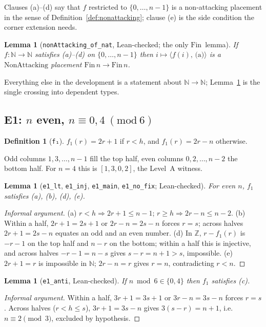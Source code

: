 \documentclass[11pt,a4paper]{article}
\newtheorem{lemma}[theorem]{Lemma}
\theoremstyle{definition}
\newtheorem{definition}[theorem]{Definition}
\theoremstyle{remark}
\newcommand{\lean}[1]{\texttt{#1}}
\newcommand{\N}{\mathbb{N}}
\newcommand{\Fin}{\mathrm{Fin}\,}
\newcommand{\NonAttacking}{\mathrm{NonAttacking}}
\begin{document}
Clauses (a)--(d) say that $f$ restricted to $\{0,\dots,n-1\}$ is a non-attacking placement
in the sense of Definition~\ref{def:nonattacking}; clause (e) is the side condition the
corner extension needs.

\begin{lemma}[\lean{nonAttacking\_of\_nat}, Lean-checked; the only $\Fin$ lemma]
\label{lem:transfer}
If $f:\N\to\N$ satisfies (a)--(d) on $\{0,\dots,n-1\}$ then
$i\mapsto \langle f(i),\,\text{(a)}\rangle$ is a $\NonAttacking$ placement $\Fin n\to\Fin n$.
\end{lemma}

Everything else in the development is a statement about $\N\to\N$; Lemma~\ref{lem:transfer}
is the single crossing into dependent types.

\subsection{E1: \texorpdfstring{$n$ even, $n \equiv 0,4 \ (\mathrm{mod}\ 6)$}{n even, n = 0,4 (mod 6)}}

\begin{definition}[\lean{f₁}]
$f_1(r) = 2r+1$ if $r<h$, and $f_1(r)=2r-n$ otherwise.
\end{definition}

Odd columns $1,3,\dots,n-1$ fill the top half, even columns $0,2,\dots,n-2$ the bottom half.
For $n=4$ this is $[1,3,0,2]$, the Level~A witness.

\begin{lemma}[\lean{e1\_lt}, \lean{e1\_inj}, \lean{e1\_main},
\lean{e1\_no\_fix}; Lean-checked]
For even $n$, $f_1$ satisfies (a), (b), (d), (e).
\end{lemma}
\begin{proof}[Informal argument]
(a) $r<h\Rightarrow 2r+1\le n-1$; $r\ge h\Rightarrow 2r-n\le n-2$.
(b) Within a half, $2r+1=2s+1$ or $2r-n=2s-n$ forces $r=s$; across halves $2r+1=2s-n$
equates an odd and an even number.
(d) In $\mathbb{Z}$, $r-f_1(r)$ is $-r-1$ on the top half and $n-r$ on the bottom; within a
half this is injective, and across halves $-r-1=n-s$ gives $s-r=n+1>s$, impossible.
(e) $2r+1=r$ is impossible in $\N$; $2r-n=r$ gives $r=n$, contradicting $r<n$.
\end{proof}

\begin{lemma}[\lean{e1\_anti}, Lean-checked]
\label{lem:e1anti}
If $n\bmod 6\in\{0,4\}$ then $f_1$ satisfies (c).
\end{lemma}
\begin{proof}[Informal argument]
Within a half, $3r+1=3s+1$ or $3r-n=3s-n$ forces $r=s$. Across halves ($r<h\le s$),
$3r+1=3s-n$ gives $3(s-r)=n+1$, i.e.\ $n\equiv 2\pmod 3$, excluded by hypothesis.
\end{proof}
\end{document}
